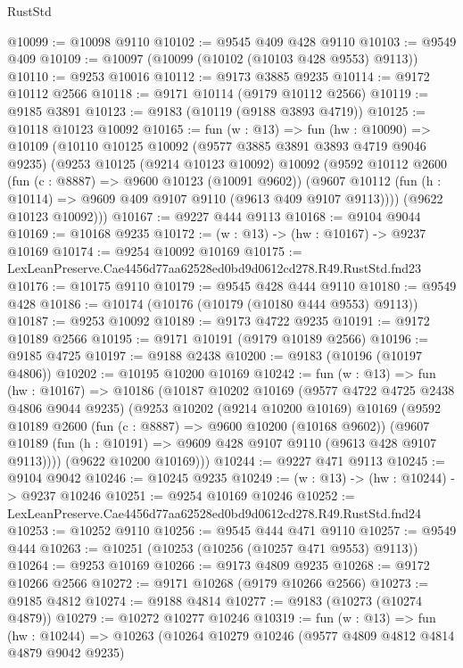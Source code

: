 \begin{lexlean}{RustStd}
\begin{coremodule}
@10099 := @10098 @9110
@10102 := @9545 @409 @428 @9110
@10103 := @9549 @409
@10109 := @10097 (@10099 (@10102 (@10103 @428 @9553) @9113))
@10110 := @9253 @10016
@10112 := @9173 @3885 @9235
@10114 := @9172 @10112 @2566
@10118 := @9171 @10114 (@9179 @10112 @2566)
@10119 := @9185 @3891
@10123 := @9183 (@10119 (@9188 @3893 @4719))
@10125 := @10118 @10123 @10092
@10165 := fun (w : @13) =>
  fun (hw : @10090) =>
  @10109
    (@10110
      @10125
      @10092
      (@9577 @3885 @3891 @3893 @4719 @9046 @9235)
      (@9253
        @10125
        (@9214 @10123 @10092)
        @10092
        (@9592
          @10112
          @2600
          (fun (c : @8887) => @9600 @10123 (@10091 @9602))
          (@9607 @10112 (fun (h : @10114) => @9609 @409 @9107 @9110 (@9613 @409 @9107 @9113))))
        (@9622 @10123 @10092)))
@10167 := @9227 @444 @9113
@10168 := @9104 @9044
@10169 := @10168 @9235
@10172 := (w : @13) -> (hw : @10167) -> @9237 @10169
@10174 := @9254 @10092 @10169
@10175 := LexLeanPreserve.Cae4456d77aa62528ed0bd9d0612cd278.R49.RustStd.fnd23
@10176 := @10175 @9110
@10179 := @9545 @428 @444 @9110
@10180 := @9549 @428
@10186 := @10174 (@10176 (@10179 (@10180 @444 @9553) @9113))
@10187 := @9253 @10092
@10189 := @9173 @4722 @9235
@10191 := @9172 @10189 @2566
@10195 := @9171 @10191 (@9179 @10189 @2566)
@10196 := @9185 @4725
@10197 := @9188 @2438
@10200 := @9183 (@10196 (@10197 @4806))
@10202 := @10195 @10200 @10169
@10242 := fun (w : @13) =>
  fun (hw : @10167) =>
  @10186
    (@10187
      @10202
      @10169
      (@9577 @4722 @4725 @2438 @4806 @9044 @9235)
      (@9253
        @10202
        (@9214 @10200 @10169)
        @10169
        (@9592
          @10189
          @2600
          (fun (c : @8887) => @9600 @10200 (@10168 @9602))
          (@9607 @10189 (fun (h : @10191) => @9609 @428 @9107 @9110 (@9613 @428 @9107 @9113))))
        (@9622 @10200 @10169)))
@10244 := @9227 @471 @9113
@10245 := @9104 @9042
@10246 := @10245 @9235
@10249 := (w : @13) -> (hw : @10244) -> @9237 @10246
@10251 := @9254 @10169 @10246
@10252 := LexLeanPreserve.Cae4456d77aa62528ed0bd9d0612cd278.R49.RustStd.fnd24
@10253 := @10252 @9110
@10256 := @9545 @444 @471 @9110
@10257 := @9549 @444
@10263 := @10251 (@10253 (@10256 (@10257 @471 @9553) @9113))
@10264 := @9253 @10169
@10266 := @9173 @4809 @9235
@10268 := @9172 @10266 @2566
@10272 := @9171 @10268 (@9179 @10266 @2566)
@10273 := @9185 @4812
@10274 := @9188 @4814
@10277 := @9183 (@10273 (@10274 @4879))
@10279 := @10272 @10277 @10246
@10319 := fun (w : @13) =>
  fun (hw : @10244) =>
  @10263
    (@10264
      @10279
      @10246
      (@9577 @4809 @4812 @4814 @4879 @9042 @9235)

\end{coremodule}
\end{lexlean}
